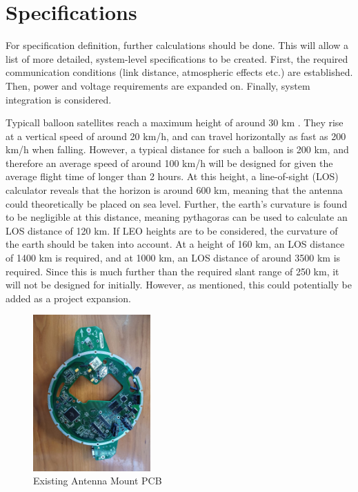 \graphicspath{{./figures}}

\section{Specifications}

For specification definition, further calculations should be done. This will allow a list of more detailed, system-level specifications to be created. First, the required communication conditions (link distance, atmospheric effects etc.) are established. Then, power and voltage requirements are expanded on. Finally, system integration is considered.

Typicall balloon satellites reach a maximum height of around 30 km \cite{site-weatherWeatherBalloons}. They rise at a vertical speed of around 20 km/h, and can travel horizontally as fast as 200 km/h when falling. However, a typical distance for such a balloon is 200 km, and therefore an average speed of around 100 km/h will be designed for given the average flight time of longer than 2 hours. At this height, a line-of-sight (LOS) calculator reveals that the horizon is around 600 km, meaning that the antenna could theoretically be placed on sea level. Further, the earth's curvature is found to be negligible at this distance, meaning pythagoras can be used to calculate an LOS distance of 120 km. If LEO heights are to be considered, the curvature of the earth should be taken into account. At a height of 160 km, an LOS distance of 1400 km is required, and at 1000 km, an LOS distance of around 3500 km is required. Since this is much further than the required slant range of 250 km, it will not be designed for initially. However, as mentioned, this could potentially be added as a project expansion.

\begin{figure}[!htb]
    \centering
    \includegraphics[width=0.4\textwidth, angle=90, origin=c]{gs_existing}
    \caption{Existing Antenna Mount PCB}
    \label{fig:gs_existing}
\end{figure}

